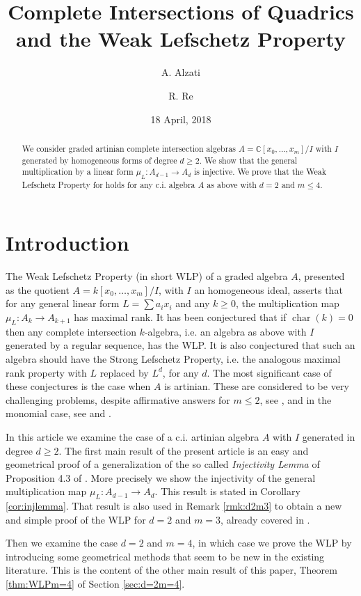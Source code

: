 \documentclass[10pt, a4paper]{amsart}
\author{A. Alzati}
\author{R. Re}
\date{18 April, 2018 }
\title{Complete Intersections of Quadrics and the Weak Lefschetz Property}
\theoremstyle{plain}
\theoremstyle{definition}
\theoremstyle{remark}
\def\C{\mathbb{C}}
\begin{document}
\maketitle
\begin{abstract} We consider graded artinian complete intersection algebras $A=\C[x_0,\ldots,x_m]/I$ with $I$ generated by homogeneous forms of degree $d\geq 2$. We  show that the general multiplication by a linear form $\mu_L:A_{d-1}\to A_d$ is injective. We prove that the Weak Lefschetz Property for holds for any c.i. algebra $A$ as above with $d=2$ and $m\leq 4$. \end{abstract}
\section{Introduction}
The Weak Lefschetz Property (in short WLP) of a graded algebra $A$, presented as the quotient $A=k[x_0,\ldots,x_m]/I$, with $I$ an homogeneous ideal, asserts that for any general linear form
$L=\sum a_ix_i$ and any $k\geq 0$, the multiplication map $\mu_L\colon A_k\to A_{k+1}$ has maximal rank.
It has been conjectured that if $\operatorname{char}(k)=0$ then any complete intersection $k$-algebra, i.e. an algebra as above with $I$ generated by a regular sequence, has the WLP. It is also conjectured that such an algebra should have the Strong Lefschetz Property, i.e. the analogous maximal rank property with $L$ replaced by $L^d$, for any $d$. The most significant case of these conjectures is the case when $A$ is artinian.
These are considered to be very challenging problems, despite affirmative answers for $m\leq 2$, see \cite{Mig2003}, and in the monomial case, see \cite{stanley} and \cite{watanabe}.

In this article we examine the case of a c.i. artinian algebra $A$ with $I$ generated in degree $d\geq 2$. 
The  first main result of the present article is an easy and geometrical proof of a generalization of the so called {\em Injectivity Lemma} of Proposition 4.3 of \cite{MN}. More precisely we show the injectivity of the general multiplication map $\mu_L:A_{d-1}\to A_d$. This result is stated in Corollary \ref{cor:injlemma}. That result is also used in Remark \ref{rmk:d2m3} to obtain a new and simple proof of the WLP for $d=2$ and $m=3$, already covered in \cite{MN}.

Then we examine the case $d=2$ and $m=4$, in which case we prove the WLP by introducing some geometrical methods that seem to be new in the existing literature. This is the content of the other main result of this paper, Theorem \ref{thm:WLPm=4} of Section \ref{sec:d=2m=4}. 
\end{document}
